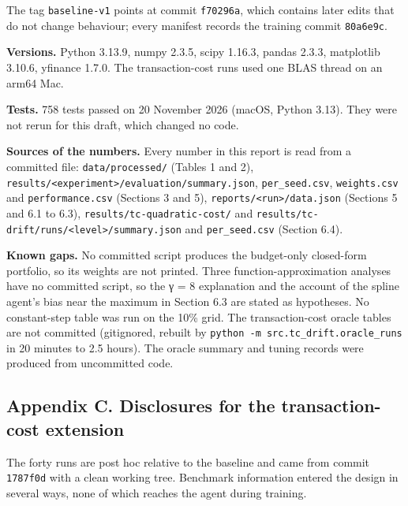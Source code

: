 \documentclass[
  11pt]{article}
\begin{document}
The tag \texttt{baseline-v1} points at commit \texttt{f70296a}, which
contains later edits that do not change behaviour; every manifest
records the training commit \texttt{80a6e9c}.

\textbf{Versions.} Python 3.13.9, numpy 2.3.5, scipy 1.16.3, pandas
2.3.3, matplotlib 3.10.6, yfinance 1.7.0. The transaction-cost runs used
one BLAS thread on an arm64 Mac.

\textbf{Tests.} 758 tests passed on 20 November 2026 (macOS, Python
3.13). They were not rerun for this draft, which changed no code.

\textbf{Sources of the numbers.} Every number in this report is read
from a committed file: \texttt{data/processed/} (Tables 1 and 2),
\texttt{results/\textless{}experiment\textgreater{}/evaluation/summary.json},
\texttt{per\_seed.csv}, \texttt{weights.csv} and
\texttt{performance.csv} (Sections 3 and 5),
\texttt{reports/\textless{}run\textgreater{}/data.json} (Sections 5 and
6.1 to 6.3), \texttt{results/tc-quadratic-cost/} and
\texttt{results/tc-drift/runs/\textless{}level\textgreater{}/summary.json}
and \texttt{per\_seed.csv} (Section 6.4).

\textbf{Known gaps.} No committed script produces the budget-only
closed-form portfolio, so its weights are not printed. Three
function-approximation analyses have no committed script, so the γ = 8
explanation and the account of the spline agent's bias near the maximum
in Section 6.3 are stated as hypotheses. No constant-step table was run
on the 10\% grid. The transaction-cost oracle tables are not committed
(gitignored, rebuilt by \texttt{python\ -m\ src.tc\_drift.oracle\_runs}
in 20 minutes to 2.5 hours). The oracle summary and tuning records were
produced from uncommitted code.

\subsection{Appendix C. Disclosures for the transaction-cost
extension}\label{appendix-c.-disclosures-for-the-transaction-cost-extension}

The forty runs are post hoc relative to the baseline and came from
commit \texttt{1787f0d} with a clean working tree. Benchmark information
entered the design in several ways, none of which reaches the agent
during training.
\end{document}
